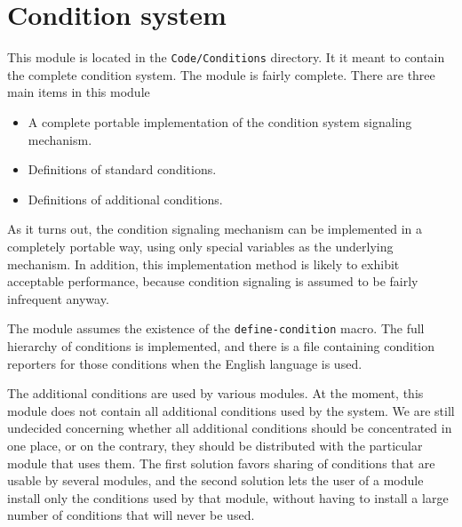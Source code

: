 \chapter{Condition system}

This module is located in the \texttt{Code/Conditions} directory.  It
it meant to contain the complete \commonlisp{} condition system.  The module
is fairly complete.  There are three main items in this module

\begin{itemize}
\item A complete portable implementation of the \commonlisp{} condition
  system signaling mechanism.
\item Definitions of standard \commonlisp{} conditions.
\item Definitions of additional \sysname{} conditions.
\end{itemize}

As it turns out, the \commonlisp{} condition signaling mechanism can be
implemented in a completely portable way, using only special variables
as the underlying mechanism.  In addition, this implementation method
is likely to exhibit acceptable performance, because condition
signaling is assumed to be fairly infrequent anyway.  

The module assumes the existence of the \texttt{define-condition}
macro.  The full hierarchy of \commonlisp{} conditions is implemented, and
there is a file containing condition reporters for those conditions
when the English language is used.

The additional conditions are used by various \sysname{} modules.
At the moment, this module does not contain all additional conditions
used by the system.  We are still undecided concerning whether all
additional conditions should be concentrated in one place, or on the
contrary, they should be distributed with the particular module that
uses them.  The first solution favors sharing of conditions that are
usable by several modules, and the second solution lets the user of a
module install only the conditions used by that module, without having
to install a large number of conditions that will never be used.
